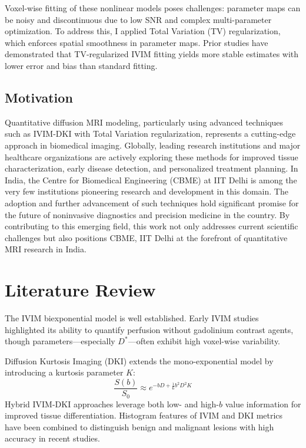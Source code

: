 \documentclass[a4paper,12pt]{article}
\begin{document}
Voxel-wise fitting of these nonlinear models poses challenges: parameter maps can be noisy and discontinuous due to low SNR and complex multi-parameter optimization. To address this, I applied Total Variation (TV) regularization, which enforces spatial smoothness in parameter maps. Prior studies have demonstrated that TV-regularized IVIM fitting yields more stable estimates with lower error and bias than standard fitting.

\subsection*{Motivation}
Quantitative diffusion MRI modeling, particularly using advanced techniques such as IVIM-DKI with Total Variation regularization, represents a cutting-edge approach in biomedical imaging. Globally, leading research institutions and major healthcare organizations are actively exploring these methods for improved tissue characterization, early disease detection, and personalized treatment planning. In India, the Centre for Biomedical Engineering (CBME) at IIT Delhi is among the very few institutions pioneering research and development in this domain. The adoption and further advancement of such techniques hold significant promise for the future of noninvasive diagnostics and precision medicine in the country. By contributing to this emerging field, this work not only addresses current scientific challenges but also positions CBME, IIT Delhi at the forefront of quantitative MRI research in India.

\section{Literature Review}
The IVIM biexponential model is well established. Early IVIM studies highlighted its ability to quantify perfusion without gadolinium contrast agents, though parameters—especially $D^{*}$—often exhibit high voxel-wise variability.

Diffusion Kurtosis Imaging (DKI) extends the mono-exponential model by introducing a kurtosis parameter $K$:
\begin{equation}
    \frac{S(b)}{S_{0}} \approx e^{-bD + \frac{1}{6}b^{2}D^{2}K}
\end{equation}
Hybrid IVIM-DKI approaches leverage both low- and high-$b$ value information for improved tissue differentiation. Histogram features of IVIM and DKI metrics have been combined to distinguish benign and malignant lesions with high accuracy in recent studies.
\end{document}
